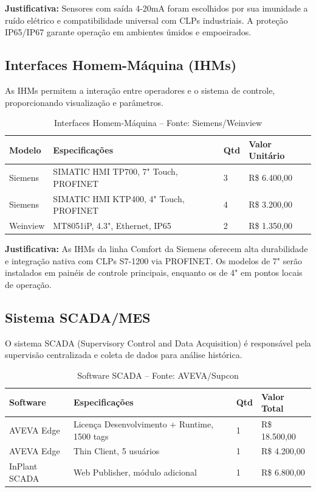 \documentclass[12pt,a4paper]{article}
\begin{document}
\textbf{Justificativa:} Sensores com saída 4-20mA foram escolhidos por sua imunidade a ruído elétrico e compatibilidade universal com CLPs industriais. A proteção IP65/IP67 garante operação em ambientes úmidos e empoeirados.

\subsection{Interfaces Homem-Máquina (IHMs)}

As IHMs permitem a interação entre operadores e o sistema de controle, proporcionando visualização e parâmetros.

\begin{table}[h]
\centering
\begin{tabular}{@{}p{3cm}|p{5cm}|p{2cm}|p{3cm}@{}}
\toprule
\textbf{Modelo} & \textbf{Especificações} & \textbf{Qtd} & \textbf{Valor Unitário} \\
\midrule
Siemens & SIMATIC HMI TP700, 7" Touch, PROFINET & 3 & R\$ 6.400,00 \\
\midrule
Siemens & SIMATIC HMI KTP400, 4" Touch, PROFINET & 4 & R\$ 3.200,00 \\
\midrule
Weinview & MT8051iP, 4.3", Ethernet, IP65 & 2 & R\$ 1.350,00 \\
\bottomrule
\end{tabular}
\caption{Interfaces Homem-Máquina -- Fonte: Siemens/Weinview}
\end{table}

\textbf{Justificativa:} As IHMs da linha Comfort da Siemens oferecem alta durabilidade e integração nativa com CLPs S7-1200 via PROFINET. Os modelos de 7" serão instalados em painéis de controle principais, enquanto os de 4" em pontos locais de operação.

\subsection{Sistema SCADA/MES}

O sistema SCADA (Supervisory Control and Data Acquisition) é responsável pela supervisão centralizada e coleta de dados para análise histórica.

\begin{table}[h]
\centering
\begin{tabular}{@{}p{3cm}|p{5cm}|p{2cm}|p{3cm}@{}}
\toprule
\textbf{Software} & \textbf{Especificações} & \textbf{Qtd} & \textbf{Valor Total} \\
\midrule
AVEVA Edge & Licença Desenvolvimento + Runtime, 1500 tags & 1 & R\$ 18.500,00 \\
\midrule
AVEVA Edge & Thin Client, 5 usuários & 1 & R\$ 4.200,00 \\
\midrule
InPlant SCADA & Web Publisher, módulo adicional & 1 & R\$ 6.800,00 \\
\bottomrule
\end{tabular}
\caption{Software SCADA -- Fonte: AVEVA/Supcon}
\end{table}
\end{document}

